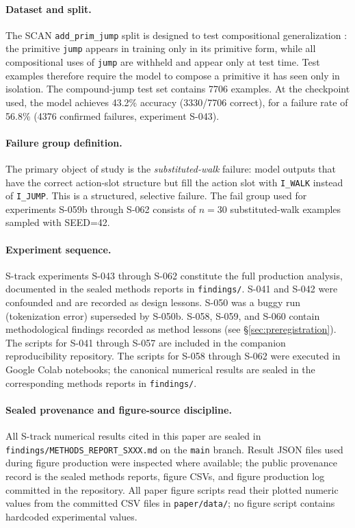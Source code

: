 \paragraph{Dataset and split.}
The SCAN \texttt{add\_prim\_jump} split is designed to test compositional generalization
\citep{lake2018scan}: the primitive \texttt{jump} appears in training only in its primitive
form, while all compositional uses of \texttt{jump} are withheld and appear only at test
time. Test examples therefore require the model to compose a primitive it has seen only
in isolation.
The compound-jump test set contains 7706 examples. At the checkpoint used, the model
achieves 43.2\% accuracy (3330/7706 correct), for a failure rate of 56.8\%
(4376 confirmed failures, experiment S-043).

\paragraph{Failure group definition.}
The primary object of study is the \emph{substituted-walk} failure: model outputs that
have the correct action-slot structure but fill the action slot with \texttt{I\_WALK}
instead of \texttt{I\_JUMP}. This is a structured, selective failure.
The fail group used for experiments S-059b through S-062 consists of $n=30$
substituted-walk examples sampled with SEED=42.

\paragraph{Experiment sequence.}
S-track experiments S-043 through S-062 constitute the full production analysis,
documented in the sealed methods reports in \texttt{findings/}.
S-041 and S-042 were confounded and are recorded as design lessons.
S-050 was a buggy run (tokenization error) superseded by S-050b.
S-058, S-059, and S-060 contain methodological findings recorded as method lessons
(see \S\ref{sec:preregistration}).
The scripts for S-041 through S-057 are included in the companion reproducibility repository.
The scripts for S-058 through S-062 were executed in Google Colab notebooks;
the canonical numerical results are sealed in the corresponding methods reports
in \texttt{findings/}.

\paragraph{Sealed provenance and figure-source discipline.}
All S-track numerical results cited in this paper are sealed in
\texttt{findings/METHODS\_REPORT\_SXXX.md} on the \texttt{main} branch.
Result JSON files used during figure production were inspected where available;
the public provenance record is the sealed methods reports, figure CSVs, and figure
production log committed in the repository.
All paper figure scripts read their plotted numeric values from the committed CSV
files in \texttt{paper/data/}; no figure script contains hardcoded experimental values.

